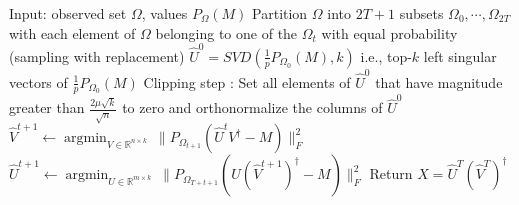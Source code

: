 \documentclass[11pt]{article}
\theoremstyle{plain}
\theoremstyle{definition}
\newcommand{\R}{\mathbb{R}}
\DeclareMathOperator*{\argmin}{argmin}
\newcommand{\aff}{{\mathcal A}}
\begin{document}
\begin{algorithm}[th]
\caption{{\bf AltMinComplete:} Alternating minimization for matrix completion}
\label{algo:completion-altmin}
\begin{algorithmic}[1]
\STATE Input: observed set $\Omega$, values $P_{\Omega}(M)$
\STATE Partition $\Omega$ into $2T+1$ subsets $\Omega_0,\cdots,\Omega_{2T}$ with each element of $\Omega$ belonging to one of the $\Omega_t$ with equal probability (sampling with replacement)
\STATE $\widehat{U}^{0}=SVD(\frac{1}{p}P_{\Omega_0}(M), k)$ i.e., top-$k$ left singular vectors of $\frac{1}{p}P_{\Omega_0}(M)$
\STATE Clipping step : Set all elements of $\widehat{U}^{0}$ that have magnitude greater than $\frac{2\mu \sqrt{k}}{\sqrt{n}}$ to zero and orthonormalize the columns of $\widehat{U}^0$
	\STATE $\widehat{V}^{t+1}\leftarrow \argmin_{V\in \R^{n\times k}} \  \|P_{\Omega_{t+1}}(\widehat{U}^t V^\dag - M)\|_F^2$
	\STATE $\widehat{U}^{t+1}\leftarrow \argmin_{U\in \mathbb{R}^{m\times k}} \  \|P_{\Omega_{T+t+1}}(U\left(\widehat{V}^{t+1}\right)^\dag - M) \|_F^2$
\ENDFOR
\STATE Return $X=\widehat{U}^T(\widehat{V}^T)^\dag $
\end{algorithmic}
\end{algorithm}
\end{document}
